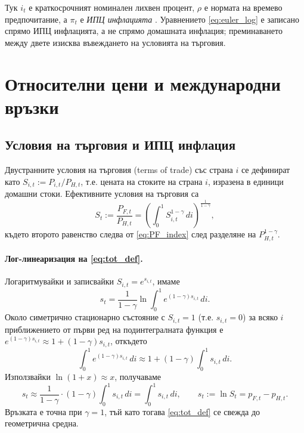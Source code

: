 Тук $i_t$ е краткосрочният номинален лихвен процент, $\rho$ е нормата на времево предпочитание, а $\pi_t$ е \emph{ИПЦ инфлацията} \parencite[с.~155]{Gali2008}. Уравнението \eqref{eq:euler_log} е записано спрямо ИПЦ инфлацията, а не спрямо домашната инфлация; преминаването между двете изисква въвеждането на условията на търговия.

\section{Относителни цени и международни връзки}

\subsection{Условия на търговия и ИПЦ инфлация}

Двустранните условия на търговия (terms of trade) със страна $i$ се дефинират като $S_{i,t} := P_{i,t} / P_{H,t}$, т.е. цената на стоките на страна $i$, изразена в единици домашни стоки. Ефективните условия на търговия са
\begin{equation}
S_t := \frac{P_{F,t}}{P_{H,t}} = \left( \int_0^1 S_{i,t}^{1-\gamma}\, di \right)^{\frac{1}{1-\gamma}},
\label{eq:tot_def}
\end{equation}
където второто равенство следва от \eqref{eq:PF_index} след разделяне на $P_{H,t}^{1-\gamma}$.

\paragraph{Лог-линеаризация на \eqref{eq:tot_def}.}
Логаритмувайки и записвайки $S_{i,t} = e^{s_{i,t}}$, имаме
\[
s_t = \frac{1}{1-\gamma} \ln \int_0^1 e^{(1-\gamma) s_{i,t}}\, di.
\]
Около симетрично стационарно състояние с $S_{i,t} = 1$ (т.е. $s_{i,t} = 0$) за всяко $i$ приближението от първи ред на подинтегралната функция е $e^{(1-\gamma)s_{i,t}} \approx 1 + (1-\gamma)s_{i,t}$, откъдето
\[
\int_0^1 e^{(1-\gamma) s_{i,t}}\, di \approx 1 + (1-\gamma) \int_0^1 s_{i,t}\, di.
\]
Използвайки $\ln(1+x) \approx x$, получаваме
\begin{equation}
s_t \approx \frac{1}{1-\gamma} \cdot (1-\gamma) \int_0^1 s_{i,t}\, di = \int_0^1 s_{i,t}\, di,
\qquad s_t := \ln S_t = p_{F,t} - p_{H,t}.
\label{eq:tot_loglin}
\end{equation}
Връзката е точна при $\gamma = 1$, тъй като тогава \eqref{eq:tot_def} се свежда до геометрична средна.

